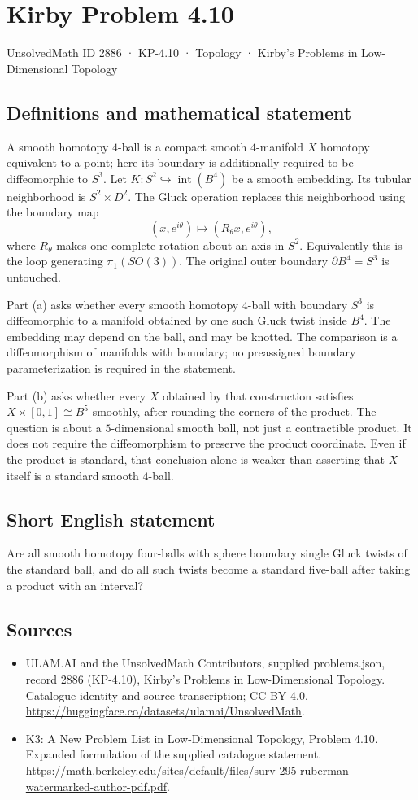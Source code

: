 \documentclass[11pt,a4paper]{article}
\begin{document}
\section*{Kirby Problem 4.10}\label{2886}
{\small UnsolvedMath ID 2886 · KP-4.10 · Topology · Kirby's Problems in Low-Dimensional Topology}
\subsection{Definitions and mathematical statement}
A smooth homotopy $4$-ball is a compact smooth $4$-manifold $X$
homotopy equivalent to a point; here its boundary is additionally
required to be diffeomorphic to $S^3$. Let $K:S^2\hookrightarrow
\operatorname{int}(B^4)$ be a smooth embedding. Its tubular neighborhood
is $S^2\times D^2$. The Gluck operation replaces this neighborhood
using the boundary map
\[
 (x,e^{i\theta})\longmapsto(R_\theta x,e^{i\theta}),
\]
where $R_\theta$ makes one complete rotation about an axis in $S^2$.
Equivalently this is the loop generating $\pi_1(SO(3))$.
The original outer boundary $\partial B^4=S^3$ is untouched.

Part (a) asks whether every smooth homotopy $4$-ball with boundary
$S^3$ is diffeomorphic to a manifold obtained by one such Gluck twist
inside $B^4$. The embedding may depend on the ball, and may be
knotted. The comparison is a diffeomorphism of manifolds with boundary;
no preassigned boundary parameterization is required in the statement.

Part (b) asks whether every $X$ obtained by that construction satisfies
$X\times[0,1]\cong B^5$ smoothly, after rounding the corners of the
product. The question is about a $5$-dimensional smooth ball, not just
a contractible product. It does not require the diffeomorphism to
preserve the product coordinate. Even if the product is standard,
that conclusion alone is weaker than asserting that $X$ itself is a
standard smooth $4$-ball.
\subsection{Short English statement}
Are all smooth homotopy four-balls with sphere boundary single Gluck twists of the standard ball, and do all such twists become a standard five-ball after taking a product with an interval?
\subsection{Sources}
\begin{itemize}
\item[S1] ULAM.AI and the UnsolvedMath Contributors, supplied problems.json, record 2886 (KP-4.10), Kirby's Problems in Low-Dimensional Topology. Catalogue identity and source transcription; CC BY 4.0.
\url{https://huggingface.co/datasets/ulamai/UnsolvedMath}.
\item[S2] K3: A New Problem List in Low-Dimensional Topology, Problem 4.10. Expanded formulation of the supplied catalogue statement.
\url{https://math.berkeley.edu/sites/default/files/surv-295-ruberman-watermarked-author-pdf.pdf}.
\end{itemize}
\end{document}
